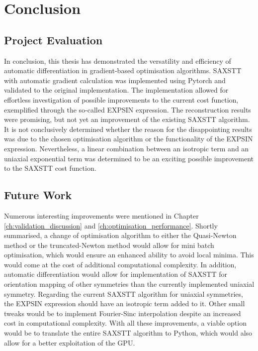 \chapter{Conclusion}

\section{Project Evaluation}

In conclusion, this thesis has demonstrated the versatility and efficiency of automatic differentiation in gradient-based optimisation algorithms.
SAXSTT with automatic gradient calculation was implemented using Pytorch and validated to the original implementation.
The implementation allowed for effortless investigation of possible improvements to the current cost function, exemplified through the so-called EXPSIN expression.
The reconstruction results were promising, but not yet an improvement of the existing SAXSTT algorithm.
It is not conclusively determined whether the reason for the disappointing results was due to the chosen optimisation algorithm or the functionality of the EXPSIN expression.
Nevertheless, a linear combination between an isotropic term and an uniaxial exponential term was determined to be an exciting possible improvement to the SAXSTT cost function.




\section{Future Work}

Numerous interesting improvements were mentioned in Chapter \ref{ch:validation_discussion} and \ref{ch:optimisation_performance}.
Shortly summarised, a change of optimisation algorithm to either the Quasi-Newton method or the truncated-Newton method would allow for mini batch optimisation,
which would ensure an enhanced ability to avoid local minima. This would come at the cost of additional computational complexity.
In addition, automatic differentiation would allow for implementation of SAXSTT for orientation mapping of other symmetries than the currently implemented uniaxial symmetry.
Regarding the current SAXSTT algorithm for uniaxial symmetries, the EXPSIN expression should have an isotropic term added to it.
Other small tweaks would be to implement Fourier-Sinc interpolation despite an increased cost in computational complexity.
With all these improvements, a viable option would be to translate the entire SAXSTT algorithm to Python, which would also allow for a better exploitation of the GPU.

